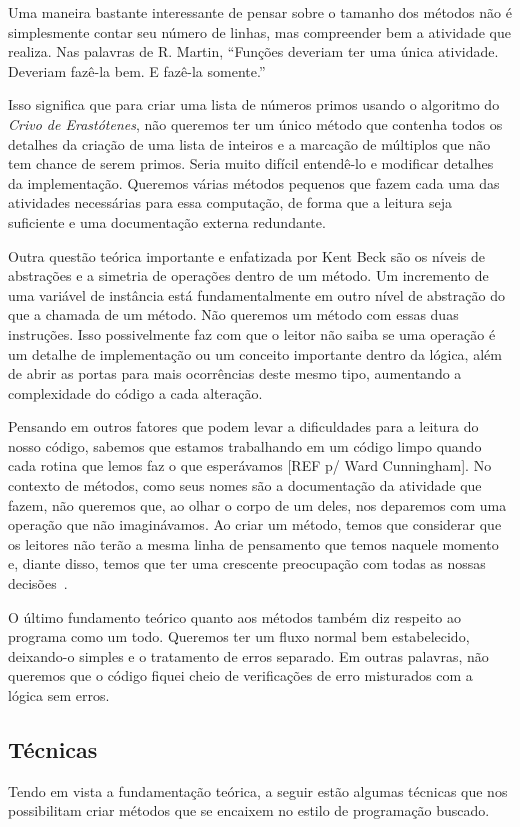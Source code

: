 Uma maneira bastante interessante de pensar sobre o tamanho dos métodos não é simplesmente contar seu número de linhas, mas compreender bem a atividade que realiza. Nas palavras de R. Martin, “Funções deveriam ter uma única atividade. Deveriam fazê-la bem. E fazê-la somente.”
	
Isso significa que para criar uma lista de números primos usando o algoritmo do \textit{Crivo de Erastótenes}, não queremos ter um único método que contenha todos os detalhes da criação de uma lista de inteiros e a marcação de múltiplos que não tem chance de serem primos. Seria muito difícil entendê-lo e modificar detalhes da implementação. Queremos várias métodos pequenos que fazem cada uma das atividades necessárias para essa computação, de forma que a leitura seja suficiente e uma documentação externa redundante.
	
Outra questão teórica importante e enfatizada por Kent Beck são os níveis de abstrações e a simetria de operações dentro de um método. Um incremento de uma variável de instância está fundamentalmente em outro nível de abstração do que a chamada de um método. Não queremos um método com essas duas instruções. Isso possivelmente faz com que o leitor não saiba se uma operação é um detalhe de implementação ou um conceito importante dentro da lógica, além de abrir as portas para mais ocorrências deste mesmo tipo, aumentando a complexidade do código a cada alteração.
	
Pensando em outros fatores que podem levar a dificuldades para a leitura do nosso código, sabemos que estamos trabalhando em um código limpo quando cada rotina que lemos faz o que esperávamos [REF p/ Ward Cunningham]. No contexto de métodos, como seus nomes são a documentação da atividade que fazem, não queremos que, ao olhar o corpo de um deles, nos deparemos com uma operação que não imaginávamos. Ao criar um método, temos que considerar que os leitores não terão a mesma linha de pensamento que temos naquele momento e, diante disso, temos que ter uma crescente preocupação com todas as nossas decisões~\citep{}.
	
O último fundamento teórico quanto aos métodos também diz respeito ao programa como um todo. Queremos ter um fluxo normal bem estabelecido, deixando-o simples e o tratamento de erros separado. Em outras palavras, não queremos que o código fiquei cheio de verificações de erro misturados com a lógica sem erros.
	
\subsection{Técnicas}
Tendo em vista a fundamentação teórica, a seguir estão algumas técnicas que nos possibilitam criar métodos que se encaixem no estilo de programação buscado.

